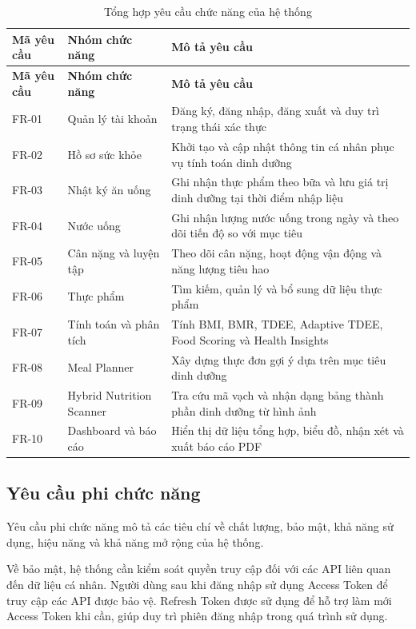 \documentclass[12pt, a4paper]{report}
\begin{document}
\begin{longtable}{|>{\raggedright\arraybackslash}p{4cm}|>{\raggedright\arraybackslash}p{4cm}|p{7cm}|}
\caption{Tổng hợp yêu cầu chức năng của hệ thống} \label{tab:tong_hop_chuc_nang_2} \\
\hline
\textbf{Mã yêu cầu} & \textbf{Nhóm chức năng} & \textbf{Mô tả yêu cầu} \\
\hline
\endfirsthead
\hline
\textbf{Mã yêu cầu} & \textbf{Nhóm chức năng} & \textbf{Mô tả yêu cầu} \\
\hline
\endhead

FR-01 & Quản lý tài khoản & Đăng ký, đăng nhập, đăng xuất và duy trì trạng thái xác thực \\
\hline
FR-02 & Hồ sơ sức khỏe & Khởi tạo và cập nhật thông tin cá nhân phục vụ tính toán dinh dưỡng \\
\hline
FR-03 & Nhật ký ăn uống & Ghi nhận thực phẩm theo bữa và lưu giá trị dinh dưỡng tại thời điểm nhập liệu \\
\hline
FR-04 & Nước uống & Ghi nhận lượng nước uống trong ngày và theo dõi tiến độ so với mục tiêu \\
\hline
FR-05 & Cân nặng và luyện tập & Theo dõi cân nặng, hoạt động vận động và năng lượng tiêu hao \\
\hline
FR-06 & Thực phẩm & Tìm kiếm, quản lý và bổ sung dữ liệu thực phẩm \\
\hline
FR-07 & Tính toán và phân tích & Tính BMI, BMR, TDEE, Adaptive TDEE, Food Scoring và Health Insights \\
\hline
FR-08 & Meal Planner & Xây dựng thực đơn gợi ý dựa trên mục tiêu dinh dưỡng \\
\hline
FR-09 & Hybrid Nutrition Scanner & Tra cứu mã vạch và nhận dạng bảng thành phần dinh dưỡng từ hình ảnh \\
\hline
FR-10 & Dashboard và báo cáo & Hiển thị dữ liệu tổng hợp, biểu đồ, nhận xét và xuất báo cáo PDF \\
\hline
\end{longtable}

\subsection{Yêu cầu phi chức năng}Yêu cầu phi chức năng mô tả các tiêu chí về chất lượng, bảo mật, khả năng sử dụng, hiệu năng và khả năng mở rộng của hệ thống.

Về bảo mật, hệ thống cần kiểm soát quyền truy cập đối với các API liên quan đến dữ liệu cá nhân. Người dùng sau khi đăng nhập sử dụng Access Token để truy cập các API được bảo vệ. Refresh Token được sử dụng để hỗ trợ làm mới Access Token khi cần, giúp duy trì phiên đăng nhập trong quá trình sử dụng.
\end{document}
